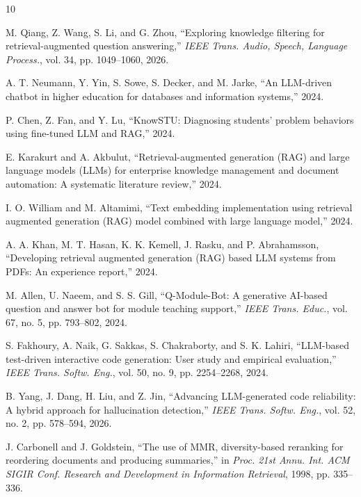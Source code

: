 \documentclass[conference]{IEEEtran}
\begin{document}
\begin{thebibliography}{10}

M. Qiang, Z. Wang, S. Li, and G. Zhou, ``Exploring knowledge filtering for retrieval-augmented question answering,'' \emph{IEEE Trans. Audio, Speech, Language Process.}, vol. 34, pp. 1049--1060, 2026.

A. T. Neumann, Y. Yin, S. Sowe, S. Decker, and M. Jarke, ``An LLM-driven chatbot in higher education for databases and information systems,'' 2024.

P. Chen, Z. Fan, and Y. Lu, ``KnowSTU: Diagnosing students' problem behaviors using fine-tuned LLM and RAG,'' 2024.

E. Karakurt and A. Akbulut, ``Retrieval-augmented generation (RAG) and large language models (LLMs) for enterprise knowledge management and document automation: A systematic literature review,'' 2024.

I. O. William and M. Altamimi, ``Text embedding implementation using retrieval augmented generation (RAG) model combined with large language model,'' 2024.

A. A. Khan, M. T. Hasan, K. K. Kemell, J. Rasku, and P. Abrahamsson, ``Developing retrieval augmented generation (RAG) based LLM systems from PDFs: An experience report,'' 2024.

M. Allen, U. Naeem, and S. S. Gill, ``Q-Module-Bot: A generative AI-based question and answer bot for module teaching support,'' \emph{IEEE Trans. Educ.}, vol. 67, no. 5, pp. 793--802, 2024.

S. Fakhoury, A. Naik, G. Sakkas, S. Chakraborty, and S. K. Lahiri, ``LLM-based test-driven interactive code generation: User study and empirical evaluation,'' \emph{IEEE Trans. Softw. Eng.}, vol. 50, no. 9, pp. 2254--2268, 2024.

B. Yang, J. Dang, H. Liu, and Z. Jin, ``Advancing LLM-generated code reliability: A hybrid approach for hallucination detection,'' \emph{IEEE Trans. Softw. Eng.}, vol. 52, no. 2, pp. 578--594, 2026.

J. Carbonell and J. Goldstein, ``The use of MMR, diversity-based reranking for reordering documents and producing summaries,'' in \emph{Proc. 21st Annu. Int. ACM SIGIR Conf. Research and Development in Information Retrieval}, 1998, pp. 335--336.

\end{thebibliography}
\end{document}
